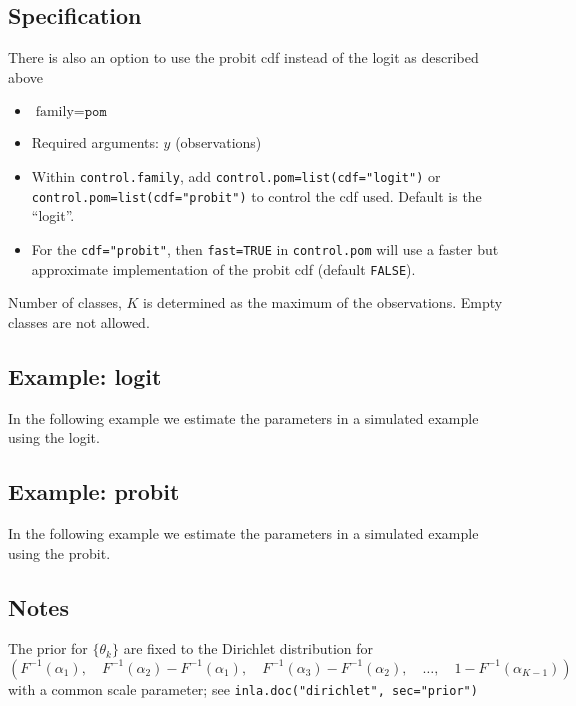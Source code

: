 \documentclass[a4paper,11pt]{article}
\begin{document}
\subsection*{Specification}

There is also an option to use the probit cdf instead of the logit as
described above
\begin{itemize}
\item $\text{family}=\texttt{pom}$
\item Required arguments: $y$ (observations)
\item Within \texttt{control.family}, add
    \texttt{control.pom=list(cdf="logit")} or \\
    \texttt{control.pom=list(cdf="probit")} to control the cdf used.
    Default is the ``logit''.
\item For the \texttt{cdf="probit"}, then \texttt{fast=TRUE} in
    \texttt{control.pom} will use a faster but approximate
    implementation of the probit cdf (default \texttt{FALSE}).
\end{itemize}
Number of classes, $K$ is determined as the maximum of the
observations. Empty classes are not allowed.




\subsection*{Example: logit}

In the following example we estimate the parameters in a simulated
example using the logit.
{\small

}

\subsection*{Example: probit}

In the following example we estimate the parameters in a simulated
example using the probit.
{\small

}

\subsection*{Notes}

The prior for $\{\theta_k\}$ are fixed to the Dirichlet distribution
for
\begin{displaymath}
    \left(F^{-1}(\alpha_1),\quad
    F^{-1}(\alpha_2)- F^{-1}(\alpha_1),\quad
    F^{-1}(\alpha_3)- F^{-1}(\alpha_2),\quad
    \ldots,\quad
    1-F^{-1}(\alpha_{K-1})\right)
\end{displaymath}    
with a common scale parameter; see \texttt{inla.doc("dirichlet", sec="prior")}
\end{document}
